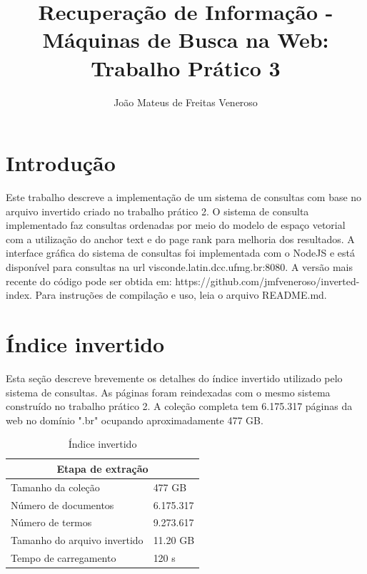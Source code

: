 \documentclass{article}
\begin{document}
\title{Recuperação de Informação - Máquinas de Busca na Web: Trabalho Prático 3}
\author{João Mateus de Freitas Veneroso}

\maketitle

\section{Introdução}

Este trabalho descreve a implementação de um sistema de consultas com base no arquivo
invertido criado no trabalho prático 2. O sistema de consulta implementado faz 
consultas ordenadas por meio do modelo de espaço vetorial com a utilização do
anchor text e do page rank para melhoria dos resultados. A interface gráfica do sistema
de consultas foi implementada com o NodeJS e está disponível para consultas na
url visconde.latin.dcc.ufmg.br:8080. A versão mais recente do código pode ser obtida
em: https://github.com/jmfveneroso/inverted-index. Para instruções de compilação e uso, leia
o arquivo README.md. 

\section{Índice invertido}

Esta seção descreve brevemente os detalhes do índice invertido utilizado pelo sistema
de consultas. As páginas foram reindexadas com o mesmo sistema construído no trabalho
prático 2. A coleção completa tem 6.175.317 páginas da web no domínio ".br" ocupando
aproximadamente 477 GB. 

\begin{table}
\centering
\begin{tabular}{ |l|l| }
  \hline
  \multicolumn{2}{|c|}{Etapa de extração} \\
  \hline
  Tamanho da coleção & 477 GB \\
  Número de documentos & 6.175.317 \\
  Número de termos & 9.273.617 \\
  Tamanho do arquivo invertido & 11.20 GB \\
  Tempo de carregamento & 120 s \\
  \hline
\end{tabular}
\caption{Índice invertido}
\label{tab:inverted_index}
\end{table}
\end{document}
